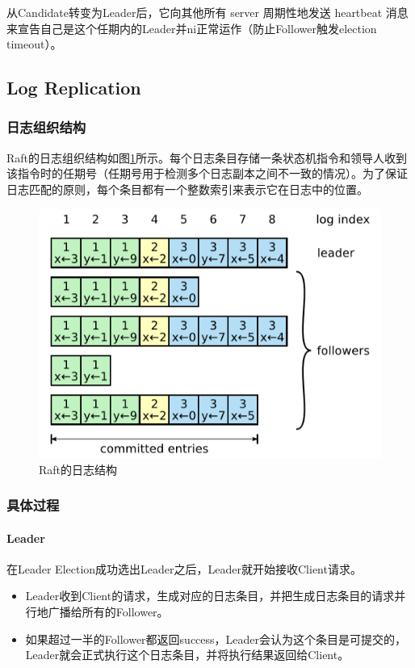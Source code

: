 \documentclass[UTF8]{article}
\begin{document}
从Candidate转变为Leader后，它向其他所有 server 周期性地发送 heartbeat 消息来宣告自己是这个任期内的Leader并ni正常运作（防止Follower触发election timeout）。

\subsection{Log Replication}

\subsubsection{日志组织结构}

Raft的日志组织结构如图\ref{fig:raft_log}所示。每个日志条目存储一条状态机指令和领导人收到该指令时的任期号（任期号用于检测多个日志副本之间不一致的情况）。为了保证日志匹配的原则，每个条目都有一个整数索引来表示它在日志中的位置。

\begin{figure}[h]
	\centering
	\includegraphics[width=0.5\linewidth]{figures/raft_log}
	\caption{Raft的日志结构}
	\label{fig:raft_log}
\end{figure}

\subsubsection{具体过程}

\paragraph{Leader} 在Leader Election成功选出Leader之后，Leader就开始接收Client请求。

\begin{itemize}
	\item Leader收到Client的请求，生成对应的日志条目，并把生成日志条目的请求并行地广播给所有的Follower。
	\item 如果超过一半的Follower都返回success，Leader会认为这个条目是可提交的，Leader就会正式执行这个日志条目，并将执行结果返回给Client。 
\end{itemize}
\end{document}
